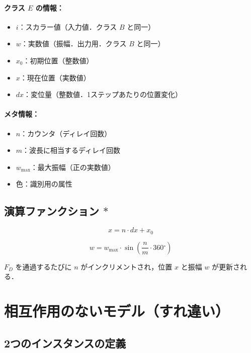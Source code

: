 \documentclass[12pt,a4paper]{ltjsarticle}
\begin{document}
\paragraph{クラス $E$ の情報：}

\begin{itemize}
  \item $i$：スカラー値（入力値．クラス $B$ と同一）
  \item $w$：実数値（振幅．出力用．クラス $B$ と同一）
  \item $x_0$：初期位置（整数値）
  \item $x$：現在位置（実数値）
  \item $dx$：変位量（整数値．1ステップあたりの位置変化）
\end{itemize}

\paragraph{メタ情報：}

\begin{itemize}
  \item $n$：カウンタ（ディレイ回数）
  \item $m$：波長に相当するディレイ回数
  \item $w_{\max}$：最大振幅（正の実数値）
  \item 色：識別用の属性
\end{itemize}

\subsection{演算ファンクション $*$}

\begin{equation}
x = n \cdot dx + x_0
\end{equation}

\begin{equation}
w = w_{\max} \cdot \sin\!\left(\frac{n}{m} \cdot 360{}^\circ\right)
\end{equation}

$F_D$ を通過するたびに $n$ がインクリメントされ，位置 $x$ と振幅 $w$ が更新される．

\section{相互作用のないモデル（すれ違い）}

\subsection{2つのインスタンスの定義}
\end{document}
